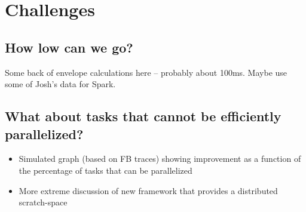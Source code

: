\section{Challenges}

\subsection{How low can we go?}
Some back of envelope calculations here -- probably about 100ms. Maybe use
some of Josh's data for Spark.

\subsection{What about tasks that cannot be efficiently parallelized?}
\begin{itemize}
\item Simulated graph (based on FB traces) showing improvement as a function of
the percentage of tasks that can be parallelized
\item More extreme discussion of new framework that provides a distributed
scratch-space
\end{itemize}
